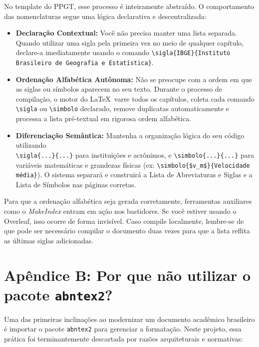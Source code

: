\documentclass[12pt, a4paper]{article}
\begin{document}
No template do PPGT, esse processo é inteiramente abstraído. O comportamento das nomenclaturas segue uma lógica declarativa e descentralizada:

\begin{itemize}
    \item \textbf{Declaração Contextual:} Você não precisa manter uma lista separada. Quando utilizar uma sigla pela primeira vez no meio de qualquer capítulo, declare-a imediatamente usando o comando \texttt{\textbackslash sigla\{IBGE\}\{Instituto Brasileiro de Geografia e Estatística\}}. 
    \item \textbf{Ordenação Alfabética Autônoma:} Não se preocupe com a ordem em que as siglas ou símbolos aparecem no seu texto. Durante o processo de compilação, o motor do \LaTeX \ varre todos os capítulos, coleta cada comando \texttt{\textbackslash sigla} ou \texttt{\textbackslash simbolo} declarado, remove duplicatas automaticamente e processa a lista pré-textual em rigorosa ordem alfabética.
    \item \textbf{Diferenciação Semântica:} Mantenha a organização lógica do seu código utilizando \\ \texttt{\textbackslash sigla\{...\}\{...\}} para instituições e acrônimos, e \texttt{\textbackslash simbolo\{...\}\{...\}} para variáveis matemáticas e grandezas físicas (ex: \texttt{\textbackslash simbolo\{\$v\_m\$\}\{Velocidade média\}}). O sistema separará e construirá a Lista de Abreviaturas e Siglas e a Lista de Símbolos nas páginas corretas.
\end{itemize}

\begin{atencao}
Para que a ordenação alfabética seja gerada corretamente, ferramentas auxiliares como o \textit{MakeIndex} entram em ação nos bastidores. Se você estiver usando o Overleaf, isso ocorre de forma invisível. Caso compile localmente, lembre-se de que pode ser necessário compilar o documento duas vezes para que a lista reflita as últimas siglas adicionadas.
\end{atencao}

\section{Apêndice B: Por que não utilizar o pacote \texttt{abntex2}?}

Uma das primeiras inclinações ao modernizar um documento acadêmico brasileiro é importar o pacote \texttt{abntex2} para gerenciar a formatação. Neste projeto, essa prática foi terminantemente descartada por razões arquiteturais e normativas:
\end{document}
